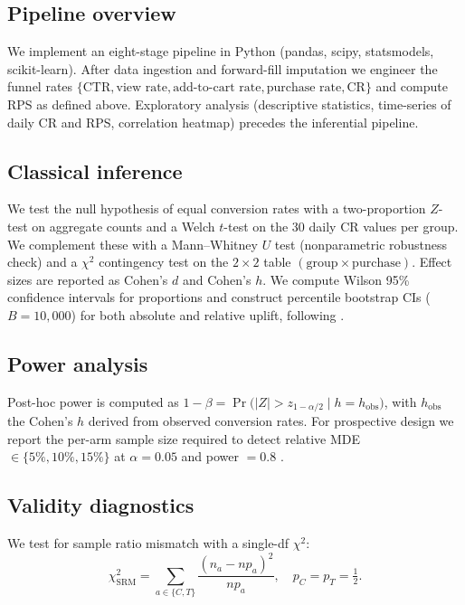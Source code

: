 \documentclass[pdflatex,sn-mathphys-num]{sn-jnl}
\theoremstyle{thmstyleone}
\theoremstyle{thmstyletwo}
\theoremstyle{thmstylethree}
\begin{document}
\subsection{Pipeline overview}\label{subsec:methods-pipeline}

We implement an eight-stage pipeline in Python (pandas, scipy, statsmodels, scikit-learn).
After data ingestion and forward-fill imputation we engineer the funnel rates
$\{\text{CTR}, \text{view rate}, \text{add-to-cart rate}, \text{purchase rate}, \text{CR}\}$
and compute RPS as defined above. Exploratory analysis (descriptive statistics,
time-series of daily CR and RPS, correlation heatmap) precedes the inferential pipeline.

\subsection{Classical inference}\label{subsec:methods-classical}

We test the null hypothesis of equal conversion rates with a two-proportion
$Z$-test on aggregate counts and a Welch $t$-test on the 30 daily CR values per group.
We complement these with a Mann--Whitney $U$ test (nonparametric robustness check)
and a $\chi^{2}$ contingency test on the $2\times 2$ table
$(\text{group}\times\text{purchase})$. Effect sizes are reported as Cohen's $d$
and Cohen's $h$. We compute Wilson 95\% confidence intervals for proportions \cite{larsen2024statistical}
and construct percentile bootstrap CIs ($B=10{,}000$) for both absolute and relative uplift,
following \cite{davison1997bootstrap}.

\subsection{Power analysis}\label{subsec:methods-power}

Post-hoc power is computed as
$1-\beta = \Pr\!\big(|Z| > z_{1-\alpha/2}\;\big|\;h=h_{\text{obs}}\big)$,
with $h_{\text{obs}}$ the Cohen's $h$ derived from observed conversion rates.
For prospective design we report the per-arm sample size required to detect
relative MDE $\in\{5\%, 10\%, 15\%\}$ at $\alpha=0.05$ and power $=0.8$ \cite{wan2023sample}.

\subsection{Validity diagnostics}\label{subsec:methods-validity}

We test for sample ratio mismatch with a single-df $\chi^{2}$:
\begin{equation}
\chi^{2}_{\mathrm{SRM}} = \sum_{a\in\{C,T\}} \frac{(n_{a} - n p_{a})^{2}}{n p_{a}}, \quad p_{C}=p_{T}=\tfrac{1}{2}.
\end{equation}
\end{document}
